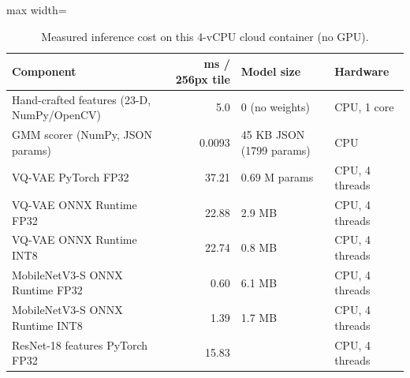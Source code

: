 \begin{table}[H]\centering\small
\caption{Measured inference cost on this 4-vCPU cloud container (no GPU).}\label{tab:latency}
\begin{adjustbox}{max width=\linewidth}\begin{tabular}{p{6cm}rp{4cm}l}\toprule
\textbf{Component} & \textbf{ms / 256px tile} & \textbf{Model size} & \textbf{Hardware} \\\midrule
Hand-crafted features (23-D, NumPy/OpenCV) & 5.0 & 0 (no weights) & CPU, 1 core \\
GMM scorer (NumPy, JSON params) & 0.0093 & 45 KB JSON (1799 params) & CPU \\
VQ-VAE PyTorch FP32 & 37.21 & 0.69 M params & CPU, 4 threads \\
VQ-VAE ONNX Runtime FP32 & 22.88 & 2.9 MB & CPU, 4 threads \\
VQ-VAE ONNX Runtime INT8 & 22.74 & 0.8 MB & CPU, 4 threads \\
MobileNetV3-S ONNX Runtime FP32 & 0.60 & 6.1 MB & CPU, 4 threads \\
MobileNetV3-S ONNX Runtime INT8 & 1.39 & 1.7 MB & CPU, 4 threads \\
ResNet-18 features PyTorch FP32 & 15.83 &  & CPU, 4 threads \\
\bottomrule\end{tabular}\end{adjustbox}\end{table}